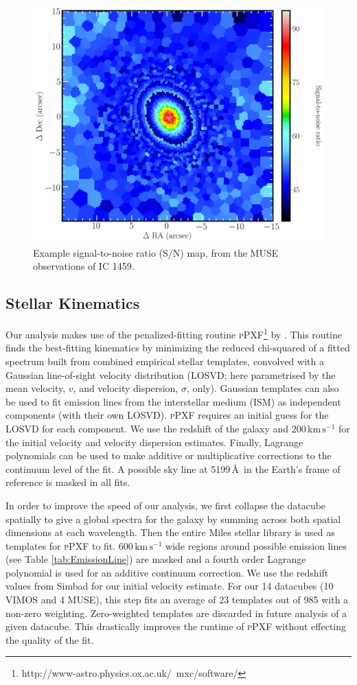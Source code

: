 		\begin{figure}
			\centering
			\includegraphics[width=.6\textwidth]{chapter2/egSNR.png}
			\caption[Example signal-to-noise map]{Example signal-to-noise ratio (S/N) map, from the MUSE observations of IC 1459.}
			\label{fig:egSNR}
		\end{figure}

	\subsection{Stellar Kinematics}
		\label{subsec:StellarFit}
		Our analysis makes use of the penalized-fitting routine \textsc{pPXF}\footnote{http://www-astro.physics.ox.ac.uk/~mxc/software/} by \citet{Cappellari2004, Cappellari2016a}. This routine finds the best-fitting kinematics by minimizing the reduced chi-squared of a fitted spectrum built from combined empirical stellar templates, convolved with a Gaussian line-of-sight velocity distribution (LOSVD; here parametrised by the mean velocity, $v$, and velocity dispersion, $\sigma$, only). Gaussian templates can also be used to fit emission lines from the interstellar medium (ISM) as independent components (with their own LOSVD). \textsc{pPXF} requires an initial guess for the LOSVD for each component. We use the redshift of the galaxy and $200\,\mathrm{km\,s^{-1}}$ for the initial velocity and velocity dispersion estimates. Finally, Lagrange polynomials can be used to make additive or multiplicative corrections to the continuum level of the fit. A possible sky line at 5199\,\AA\ in the Earth's frame of reference is masked in all fits.

		In order to improve the speed of our analysis, we first collapse the datacube spatially to give a global spectra for the galaxy by summing across both spatial dimensions at each wavelength. Then the entire Miles stellar library \citep{Sanchez-Blazquez2006, Falcon-Barroso2011a} is used as templates for \textsc{pPXF} to fit. $600\,\mathrm{km\,s^{-1}}$ wide regions around possible emission lines (see Table \ref{tab:EmissionLine}) are masked and a fourth order Lagrange polynomial is used for an additive continuum correction. We use the redshift values from Simbad \citep{Wenger2000} for our initial velocity estimate. For our 14 datacubes (10 VIMOS and 4 MUSE), this step fits an average of 23 templates out of 985 with a non-zero weighting. Zero-weighted templates are discarded in future analysis of a given datacube. This drastically improves the runtime of \textsc{pPXF} without effecting the quality of the fit.

